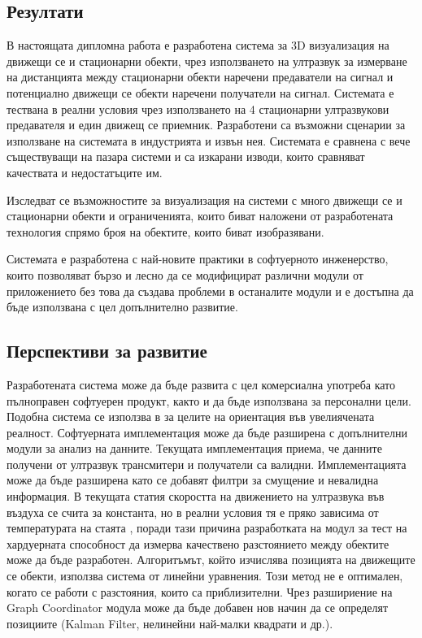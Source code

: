\subsection{Резултати}

В настоящата дипломна работа е разработена система за 3D визуализация на движещи се и стационарни обекти, чрез използването на ултразвук за измерване на дистанцията между стационарни обекти наречени предаватели на сигнал и потенциално движещи се обекти наречени получатели на сигнал. Системата е тествана в реални условия чрез използването на 4 стационарни ултразвукови предавателя и един движещ се приемник. Разработени са възможни сценарии за използване на системата в индустрията и извън нея. Системата е сравнена с вече съществуващи на пазара системи и са изкарани изводи, които сравняват качествата и недостатъците им.

Изследват се възможностите за визуализация на системи с много движещи се и стационарни обекти и ограниченията, които биват наложени от разработената технология спрямо броя на обектите, които биват изобразявани.

Системата е разработена с най-новите практики в софтуерното инженерство, които позволяват бързо и лесно да се модифицират различни модули от приложението без това да създава проблеми в останалите модули и е достъпна да бъде използвана с цел допълнително развитие.

\subsection{Перспективи за развитие}
Разработената система може да бъде развита с цел комерсиална употреба като пълноправен софтуерен продукт, както и да бъде използвана за персонални цели. Подобна система се използва в \cite{vr} за целите на ориентация във увелиячената реалност. Софтуерната имплементация може да бъде разширена с допълнителни модули за анализ на данните. Текущата имплементация приема, че данните получени от ултразвук трансмитери и получатели са валидни. Имплементацията може да бъде разширена като се добавят филтри за смущение и невалидна информация. В текущата статия скоростта на движението на ултразвука във въздуха се счита за константа, но в реални условия тя е пряко зависима от температурата на стаята \cite{vr}, поради тази причина разработката на модул за тест на хардуерната способност да измерва качествено разстоянието между обектите може да бъде разработен. Алгоритъмът, който изчислява позицията на движещите се обекти, използва система от линейни уравнения. Този метод не е оптимален, когато се работи с разстояния, които са приблизителни. Чрез разшириение на Graph Coordinator модула може да бъде добавен нов начин да се определят позициите (Kalman Filter, нелинейни най-малки квадрати и др.).

